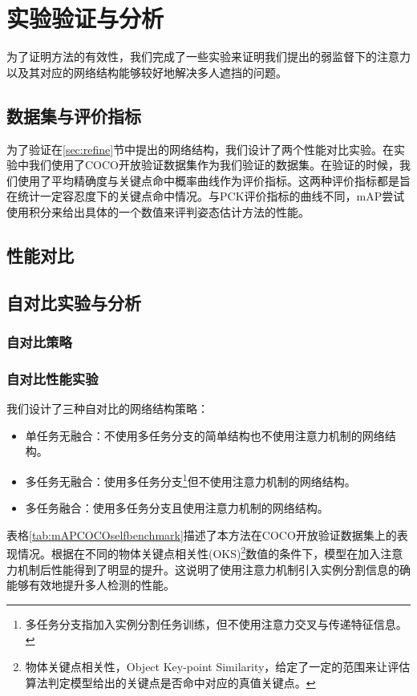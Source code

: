 \chapter{实验验证与分析}
\label{cha:exp}
为了证明方法的有效性，我们完成了一些实验来证明我们提出的弱监督下的注意力以及其对应的网络结构能够较好地解决多人遮挡的问题。
\section{数据集与评价指标}
\label{sec:dataset}
为了验证在\ref{sec:refine}节中提出的网络结构，我们设计了两个性能对比实验。在实验中我们使用了COCO开放验证数据集\cite{lin2014microsoft}作为我们验证的数据集。在验证的时候，我们使用了平均精确度与关键点命中概率曲线\cite{andriluka20142d}作为评价指标。这两种评价指标都是旨在统计一定容忍度下的关键点命中情况。与PCK评价指标的曲线不同，mAP尝试使用积分来给出具体的一个数值来评判姿态估计方法的性能。
\section{性能对比}
\label{sec:perfcompare}
\section{自对比实验与分析}
\label{sec:ablation}
\subsection{自对比策略}
\label{subsec:selfstrategy}
\subsection{自对比性能实验}
\label{subsec:selfeval}
我们设计了三种自对比的网络结构策略：
\begin{itemize}
	\item 单任务无融合：不使用多任务分支的简单结构也不使用注意力机制的网络结构。
	\item 多任务无融合：使用多任务分支\footnote{多任务分支指加入实例分割任务训练，但不使用注意力交叉与传递特征信息。}但不使用注意力机制的网络结构。
	\item 多任务融合：使用多任务分支且使用注意力机制的网络结构。
\end{itemize}

表格\ref{tab:mAPCOCOselfbenchmark}描述了本方法在COCO开放验证数据集上的表现情况。根据在不同的物体关键点相关性(OKS)\footnote{物体关键点相关性，Object Key-point Similarity，给定了一定的范围来让评估算法判定模型给出的关键点是否命中对应的真值关键点。}数值的条件下，模型在加入注意力机制后性能得到了明显的提升。这说明了使用注意力机制引入实例分割信息的确能够有效地提升多人检测的性能。

